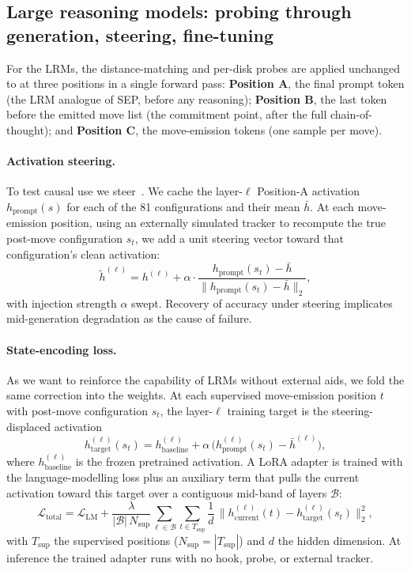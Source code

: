 \documentclass{article} %
\begin{document}
\subsection{Large reasoning models: probing through generation, steering, fine-tuning}
\label{sec:method-lrm}

For the LRMs, the distance-matching and per-disk probes are applied unchanged to at three positions in a single forward pass: \textbf{Position A}, the final prompt token (the LRM analogue of SEP, before any reasoning); \textbf{Position B}, the last token before the emitted move list (the commitment point, after the full chain-of-thought); and \textbf{Position C}, the move-emission tokens (one sample per move).

\paragraph{Activation steering.} To test causal use we steer~\citep{turner2023steering}. We cache the layer-$\ell$ Position-A activation $h_{\text{prompt}}(s)$ for each of the 81 configurations and their mean $\bar h$. At each move-emission position, using an externally simulated tracker to recompute the true post-move configuration $s_t$, we add a unit steering vector toward that configuration's clean activation:
\begin{equation}\label{eq:steering}
    \tilde{h}^{(\ell)} = h^{(\ell)} + \alpha \cdot \frac{h_{\text{prompt}}(s_t) - \bar{h}}{\|h_{\text{prompt}}(s_t) - \bar{h}\|_2},
\end{equation}
with injection strength $\alpha$ swept. Recovery of accuracy under steering implicates mid-generation degradation as the cause of failure.

\paragraph{State-encoding loss.} As we want to reinforce the capability of LRMs without external aids, we fold the same correction into the weights. At each supervised move-emission position $t$ with post-move configuration $s_t$, the layer-$\ell$ training target is the steering-displaced activation
\begin{equation}\label{eq:se-target}
h^{(\ell)}_{\text{target}}(s_t) = h^{(\ell)}_{\text{baseline}} + \alpha\,\bigl(h_{\text{prompt}}^{(\ell)}(s_t) - \bar{h}^{(\ell)}\bigr),
\end{equation}
where $h^{(\ell)}_{\text{baseline}}$ is the frozen pretrained activation. A LoRA adapter is trained with the language-modelling loss plus an auxiliary term that pulls the current activation toward this target over a contiguous mid-band of layers $\mathcal{B}$:
\begin{equation}\label{eq:se-loss}
\mathcal{L}_{\text{total}} = \mathcal{L}_{\text{LM}} + \frac{\lambda}{|\mathcal{B}|\,N_{\text{sup}}} \sum_{\ell \in \mathcal{B}} \sum_{t \in T_{\text{sup}}} \frac{1}{d}\,\bigl\| h^{(\ell)}_{\text{current}}(t) - h^{(\ell)}_{\text{target}}(s_t) \bigr\|_2^2,
\end{equation}
with $T_{\text{sup}}$ the supervised positions ($N_{\text{sup}}=|T_{\text{sup}}|$) and $d$ the hidden dimension. At inference the trained adapter runs with no hook, probe, or external tracker.
\end{document}
